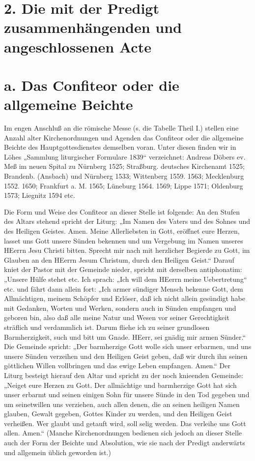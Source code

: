 \section[2. Die angeschlossenen Acte]{2. Die mit der Predigt zusammenhängenden und angeschlossenen Acte}

\section[a. Das Confiteor]{a. Das Confiteor oder die allgemeine Beichte}

Im engen Anschluß an die römische Messe (s. die Tabelle Theil I.) stellen eine Anzahl alter Kirchenordnungen und Agenden das Confiteor oder die allgemeine Beichte des Hauptgottesdienstes demselben voran. Unter diesen finden wir in Löhes „Sammlung liturgischer Formulare 1839“ verzeichnet: Andreas Döbers ev. Meß im neuen Spital zu Nürnberg 1525; Straßburg. deutsches Kirchenamt 1525; Brandenb. (Ansbach) und Nürnberg 1533; Wittenberg 1559. 1563; Mecklenburg 1552. 1650; Frankfurt a. M. 1565; Lüneburg 1564. 1569; Lippe 1571; Oldenburg 1573; Liegnitz 1594 etc.

Die Form und Weise des Confiteor an dieser Stelle ist folgende: An den Stufen des Altars stehend spricht der Liturg: „Im Namen des Vaters und des Sohnes und des Heiligen Geistes. Amen. Meine Allerliebsten in Gott, eröffnet eure Herzen, lasset uns Gott unsere Sünden bekennen und um Vergebung im Namen unseres HEerrn Jesu Christi bitten. Sprecht mir nach mit herzlicher Begierde zu Gott, im Glauben an den HEerrn Jesum Christum, durch den Heiligen Geist.“ Darauf kniet der Pastor mit der Gemeinde nieder, spricht mit derselben antiphonatim: „Unsere Hülfe stehet etc.
Ich sprach: „Ich will dem HEerrn meine Uebertretung“ etc. und fährt dann allein fort: „Ich armer sündiger Mensch bekenne Gott, dem Allmächtigen, meinem Schöpfer und Erlöser, daß ich nicht allein gesündigt habe mit Gedanken, Worten und Werken, sondern auch in Sünden empfangen und geboren bin, also daß alle meine Natur und Wesen vor seiner Gerechtigkeit sträflich und verdammlich ist. Darum fliehe ich zu seiner grundlosen Barmherzigkeit, such und bitt um Gnade. HEerr, sei gnädig mir armen Sünder.“ Die Gemeinde spricht: „Der barmherzige Gott wolle sich unser erbarmen, und uns unsere Sünden verzeihen und den Heiligen Geist geben, daß wir durch ihn seinen göttlichen Willen vollbringen und das ewige Leben empfangen. Amen.“ Der Liturg besteigt hierauf den Altar und spricht zu der noch knieenden Gemeinde: „Neiget eure Herzen zu Gott. Der allmächtige und barmherzige Gott hat sich unser erbarmt und seinen einigen Sohn für unsere Sünde in den Tod gegeben und um seinetwillen uns verziehen, auch allen denen, die an seinen heiligen Namen glauben, Gewalt gegeben, Gottes Kinder zu werden, und den Heiligen Geist verheißen. Wer glaubt und getauft wird, soll selig werden. Das verleihe uns Gott allen. Amen.“ (Manche Kirchenordnungen bedienen sich jedoch an dieser Stelle auch der Form der Beichte und Absolution, wie sie nach der Predigt anderwärts und allgemein üblich geworden ist.)

